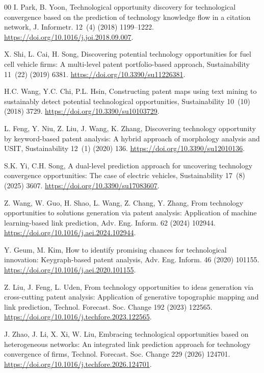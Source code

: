 \documentclass[preprint,12pt,3p]{elsarticle}
\begin{document}
\begin{thebibliography}{00}
I. Park, B. Yoon, Technological opportunity discovery for technological convergence based on the prediction of technology knowledge flow in a citation network, J. Informetr. 12~(4) (2018) 1199--1222. \url{https://doi.org/10.1016/j.joi.2018.09.007}.

X. Shi, L. Cai, H. Song, Discovering potential technology opportunities for fuel cell vehicle firms: A multi-level patent portfolio-based approach, Sustainability 11~(22) (2019) 6381. \url{https://doi.org/10.3390/su11226381}.

H.C. Wang, Y.C. Chi, P.L. Hsin, Constructing patent maps using text mining to sustainably detect potential technological opportunities, Sustainability 10~(10) (2018) 3729. \url{https://doi.org/10.3390/su10103729}.

L. Feng, Y. Niu, Z. Liu, J. Wang, K. Zhang, Discovering technology opportunity by keyword-based patent analysis: A hybrid approach of morphology analysis and USIT, Sustainability 12~(1) (2020) 136. \url{https://doi.org/10.3390/su12010136}.

S.K. Yi, C.H. Song, A dual-level prediction approach for uncovering technology convergence opportunities: The case of electric vehicles, Sustainability 17~(8) (2025) 3607. \url{https://doi.org/10.3390/su17083607}.

Z. Wang, W. Guo, H. Shao, L. Wang, Z. Chang, Y. Zhang, From technology opportunities to solutions generation via patent analysis: Application of machine learning-based link prediction, Adv. Eng. Inform. 62 (2024) 102944. \url{https://doi.org/10.1016/j.aei.2024.102944}.

Y. Geum, M. Kim, How to identify promising chances for technological innovation: Keygraph-based patent analysis, Adv. Eng. Inform. 46 (2020) 101155. \url{https://doi.org/10.1016/j.aei.2020.101155}.

Z. Liu, J. Feng, L. Uden, From technology opportunities to ideas generation via cross-cutting patent analysis: Application of generative topographic mapping and link prediction, Technol. Forecast. Soc. Change 192 (2023) 122565. \url{https://doi.org/10.1016/j.techfore.2023.122565}.

J. Zhao, J. Li, X. Xi, W. Liu, Embracing technological opportunities based on heterogeneous networks: An integrated link prediction approach for technology convergence of firms, Technol. Forecast. Soc. Change 229 (2026) 124701. \url{https://doi.org/10.1016/j.techfore.2026.124701}.


\end{thebibliography}
\end{document}
